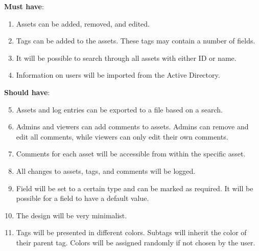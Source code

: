 
\textbf{Must have}:
\begin{enumerate}
    \item Assets can be added, removed, and edited.
    
    \item Tags can be added to the assets. These tags may contain a number of fields. 
    
    \item It will be possible to search through all assets with either ID or name.
    
    \item Information on users will be imported from the Active Directory.
\end{enumerate}

\textbf{Should have}:
\begin{enumerate}
\setcounter{enumi}{4}
    \item Assets and log entries can be exported to a file based on a search.
    
    \item Admins and viewers can add comments to assets. Admins can remove and edit all comments, while viewers can only edit their own comments.
    
    \item Comments for each asset will be accessible from within the specific asset.
    
    \item All changes to assets, tags, and comments will be logged.
    
    \item Field will be set to a certain type and can be marked as required. It will be possible for a field to have a default value. 

    \item The design will be very minimalist.
    
    \item Tags will be presented in different colors. Subtags will inherit the color of their parent tag. Colors will be assigned randomly if not chosen by the user. 
\end{enumerate}

